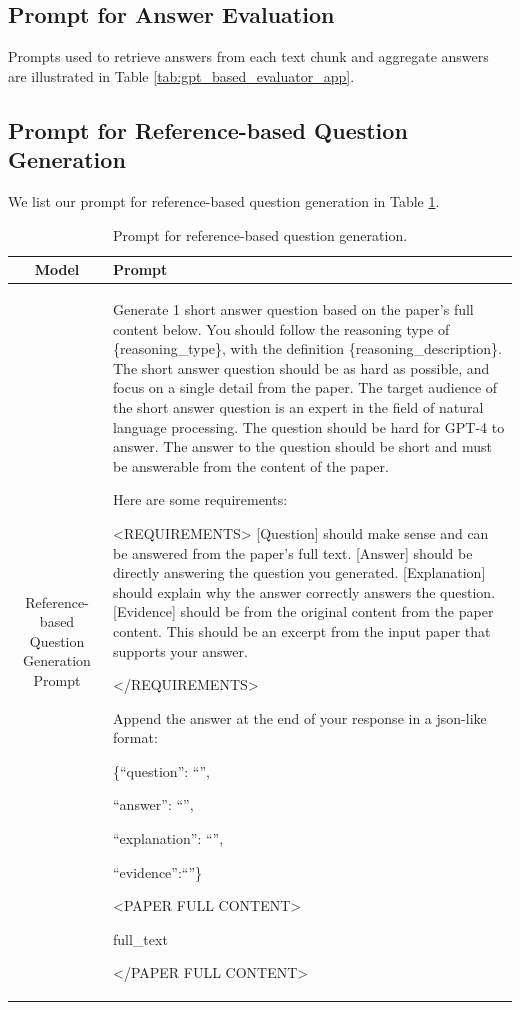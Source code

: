 

\subsection{Prompt for Answer Evaluation}
Prompts used to retrieve answers from each text chunk and aggregate answers are illustrated in Table \ref{tab:gpt_based_evaluator_app}.


\subsection{Prompt for Reference-based Question Generation}
\label{prompt_detail}
We list our prompt for reference-based question generation in Table \ref{tab:E.5}.


\begin{table}[!t]
\centering
\small
\renewcommand\tabcolsep{1.0pt} %
\begin{tabular}{cp{11.5cm}}
    \toprule
    \textbf{Model} & \textbf{Prompt} \\
    \midrule

    \multirow{18}{*}{\parbox{4cm}{\centering Reference-based Question Generation Prompt}}
    &  Generate 1 short answer question based on the paper's full content below. You should follow the reasoning type of \{reasoning\_type\}, with the definition \{reasoning\_description\}. The short answer question should be as hard as possible, and focus on a single detail from the paper. The target audience of the short answer question is an expert in the field of natural language processing. The question should be hard for GPT-4 to answer. The answer to the question should be short and must be answerable from the content of the paper.

Here are some requirements: 

<REQUIREMENTS>
[Question] should make sense and can be answered from the paper's full text.
[Answer] should be directly answering the question you generated.
[Explanation] should explain why the answer correctly answers the question.
[Evidence] should be from the original content from the paper content. This should be an excerpt from the input paper that supports your answer. 

</REQUIREMENTS>

Append the answer at the end of your response in a json-like format:

\{``question'': ``'', 

``answer'': ``'', 

``explanation'': ``'', 

``evidence'':``''\}

<PAPER FULL CONTENT>

{full\_text}

</PAPER FULL CONTENT>\\

    \bottomrule
\end{tabular}
\caption{Prompt for reference-based question generation.}
\label{tab:E.5}
\end{table}





